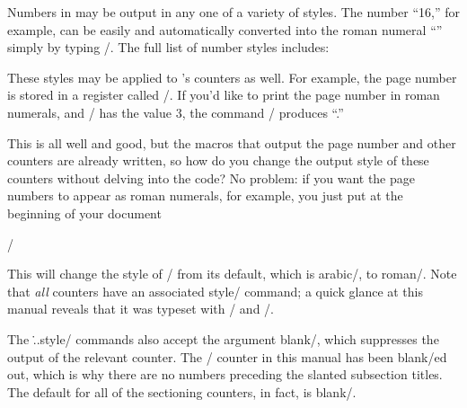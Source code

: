 Numbers in \jyTeX{} may be output in any one of a variety of styles. The
number ``16,'' for example, can be easily and automatically converted into the
roman numeral ``'' simply by typing \tts{}/. The full
list of number styles includes:

\smallskip


\smallskip

\noindent These styles may be applied to \jyTeX's counters as well.  For
example, the page number is stored in a register called \tts\pagenum/.  If 
you'd like to print the page number in roman numerals, and 
\tts\pagenum/ has the value 3, the command \tts\roman\pagenum/
produces ``\thinspace{}.''

This is all well and good, but the macros that output the page number and
other counters are already written, so how do you change the output style
of these counters without delving into the code?  No problem: if you want
the page numbers to appear as roman numerals, for example, you just put at
the beginning of your document

\nobreak\smallskip

\tts{}/

\smallskip

\noindent This will change the style of \tts\pagenum/ from its default,
which is \tts arabic/, to \tts roman/. Note that {\it all\/} \jyTeX{}
counters have an associated \tts style/ command; a quick glance at this
manual reveals that it was typeset with \tts{}/ and
\tts{}/.

The \tts\...style/ commands also accept the argument \tts blank/, which 
suppresses the output of the relevant counter. The \tts\subsectionnum/ 
counter in this manual has been \tts blank/ed out, which is why there are 
no numbers preceding the slanted subsection titles.  The default for 
all of the sectioning counters, in fact, is \tts blank/.

